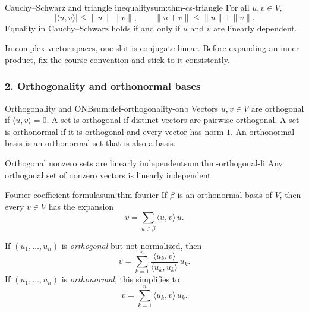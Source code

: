 \begin{theorem}{Cauchy--Schwarz and triangle inequality}{sum:thm-cs-triangle}
For all \(u,v\in V\),
\[
|\langle u,v\rangle|\le \|u\|\,\|v\|,
\qquad
\|u+v\|\le \|u\|+\|v\|.
\]
Equality in Cauchy--Schwarz holds if and only if \(u\) and \(v\) are linearly dependent.
\end{theorem}

\begin{commonmistake}[title={Common Mistake: complex linearity in the wrong slot}]
In complex vector spaces, one slot is conjugate-linear. Before expanding an inner product, fix the course convention and stick to it consistently.
\end{commonmistake}

\subsubsection*{2. Orthogonality and orthonormal bases}

\begin{definition}{Orthogonality and ONB}{sum:def-orthogonality-onb}
Vectors \(u,v\in V\) are orthogonal if \(\langle u,v\rangle=0\).  
A set is orthogonal if distinct vectors are pairwise orthogonal.  
A set is orthonormal if it is orthogonal and every vector has norm \(1\).  
An orthonormal basis is an orthonormal set that is also a basis.
\end{definition}

\begin{theorem}{Orthogonal nonzero sets are linearly independent}{sum:thm-orthogonal-li}
Any orthogonal set of nonzero vectors is linearly independent.
\end{theorem}

\begin{theorem}{Fourier coefficient formula}{sum:thm-fourier}
If \(\beta\) is an orthonormal basis of \(V\), then every \(v\in V\) has the expansion
\[
v=\sum_{u\in\beta}\langle u,v\rangle\,u.
\]
\end{theorem}

\begin{keyformula}[title={Key Formula: orthogonal versus orthonormal expansions}]
If \((u_1,\dots,u_n)\) is \emph{orthogonal} but not normalized, then
\[
v=\sum_{k=1}^n \frac{\langle u_k,v\rangle}{\langle u_k,u_k\rangle}\,u_k.
\]
If \((u_1,\dots,u_n)\) is \emph{orthonormal}, this simplifies to
\[
v=\sum_{k=1}^n \langle u_k,v\rangle\,u_k.
\]
\end{keyformula}

